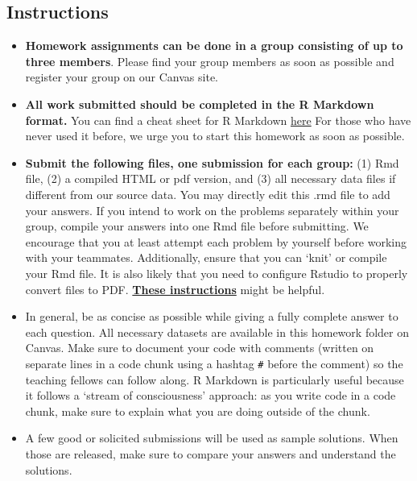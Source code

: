 \documentclass[
]{article}
\begin{document}
\hypertarget{instructions}{%
\subsection{Instructions}\label{instructions}}

\begin{itemize}
\item
  \textbf{Homework assignments can be done in a group consisting of up
  to three members}. Please find your group members as soon as possible
  and register your group on our Canvas site.
\item
  \textbf{All work submitted should be completed in the R Markdown
  format.} You can find a cheat sheet for R Markdown
  \href{https://www.rstudio.com/wp-content/uploads/2015/02/rmarkdown-cheatsheet.pdf}{here}
  For those who have never used it before, we urge you to start this
  homework as soon as possible.
\item
  \textbf{Submit the following files, one submission for each group:}
  (1) Rmd file, (2) a compiled HTML or pdf version, and (3) all
  necessary data files if different from our source data. You may
  directly edit this .rmd file to add your answers. If you intend to
  work on the problems separately within your group, compile your
  answers into one Rmd file before submitting. We encourage that you at
  least attempt each problem by yourself before working with your
  teammates. Additionally, ensure that you can `knit' or compile your
  Rmd file. It is also likely that you need to configure Rstudio to
  properly convert files to PDF.
  \href{http://kbroman.org/knitr_knutshell/pages/latex.html\#converting-knitrlatex-to-pdf}{\textbf{These
  instructions}} might be helpful.
\item
  In general, be as concise as possible while giving a fully complete
  answer to each question. All necessary datasets are available in this
  homework folder on Canvas. Make sure to document your code with
  comments (written on separate lines in a code chunk using a hashtag
  \texttt{\#} before the comment) so the teaching fellows can follow
  along. R Markdown is particularly useful because it follows a `stream
  of consciousness' approach: as you write code in a code chunk, make
  sure to explain what you are doing outside of the chunk.
\item
  A few good or solicited submissions will be used as sample solutions.
  When those are released, make sure to compare your answers and
  understand the solutions.
\end{itemize}
\end{document}
